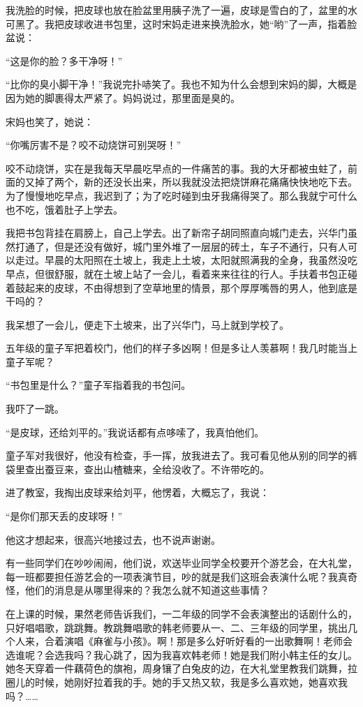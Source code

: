 \par 我洗脸的时候，把皮球也放在脸盆里用胰子洗了一遍，皮球是雪白的了，盆里的水可黑了。我把皮球收进书包里，这时宋妈走进来换洗脸水，她“哟”了一声，指着脸盆说：
\par “这是你的脸？多干净呀！”
\par “比你的臭小脚干净！”我说完扑哧笑了。我也不知为什么会想到宋妈的脚，大概是因为她的脚裹得太严紧了。妈妈说过，那里面是臭的。
\par 宋妈也笑了，她说：
\par “你嘴厉害不是？咬不动烧饼可别哭呀！”
\par 咬不动烧饼，实在是我每天早晨吃早点的一件痛苦的事。我的大牙都被虫蛀了，前面的又掉了两个，新的还没长出来，所以我就没法把烧饼麻花痛痛快快地吃下去。为了慢慢地吃早点，我迟到了；为了吃时碰到虫牙我痛得哭了。那么我就宁可什么也不吃，饿着肚子上学去。
\par 我把书包背挂在肩膀上，自己上学去。出了新帘子胡同照直向城门走去，兴华门虽然打通了，但是还没有做好，城门里外堆了一层层的砖土，车子不通行，只有人可以走过。早晨的太阳照在土坡上，我走上土坡，太阳就照满我的全身，我虽然没吃早点，但很舒服，就在土坡上站了一会儿，看着来来往往的行人。手扶着书包正碰着鼓起来的皮球，不由得想到了空草地里的情景，那个厚厚嘴唇的男人，他到底是干吗的？
\par 我呆想了一会儿，便走下土坡来，出了兴华门，马上就到学校了。
\par 五年级的童子军把着校门，他们的样子多凶啊！但是多让人羡慕啊！我几时能当上童子军呢？
\par “书包里是什么？”童子军指着我的书包问。
\par 我吓了一跳。
\par “是皮球，还给刘平的。”我说话都有点哆嗦了，我真怕他们。
\par 童子军对我很好，他没有检查，手一挥，放我进去了。我可看见他从别的同学的裤袋里查出蚕豆来，查出山楂糖来，全给没收了。不许带吃的。
\par 进了教室，我掏出皮球来给刘平，他愣着，大概忘了，我说：
\par “是你们那天丢的皮球呀！”
\par 他这才想起来，很高兴地接过去，也不说声谢谢。
\par 有一些同学们在吵吵闹闹，他们说，欢送毕业同学全校要开个游艺会，在大礼堂，每一班都要担任游艺会的一项表演节目，吵的就是我们这班会表演什么呢？我真奇怪，他们的消息是从哪里得来的？我怎么就不知道这些事情？
\par 在上课的时候，果然老师告诉我们，一二年级的同学不会表演整出的话剧什么的，只好唱唱歌，跳跳舞。教跳舞唱歌的韩老师要从一、二、三年级的同学里，挑出几个人来，合着演唱《麻雀与小孩》。啊！那是多么好听好看的一出歌舞啊！老师会选谁呢？会选我吗？我心跳了，因为我喜欢韩老师！她是我们附小韩主任的女儿。她冬天穿着一件藕荷色的旗袍，周身镶了白兔皮的边，在大礼堂里教我们跳舞，拉圈儿的时候，她刚好拉着我的手。她的手又热又软，我是多么喜欢她，她喜欢我吗？……
